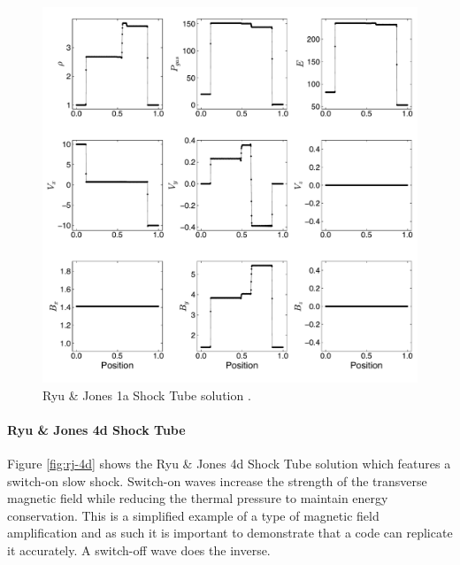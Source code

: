 \documentclass[modern]{aastex631}
\newcommand*{\img}[1]{%
    \raisebox{-.05\baselineskip}{%
        \texttt{[image: \#1]}%
    }%
}
\begin{document}
\begin{figure}[ht!]
    \includegraphics[width=\linewidth]{rj1a.pdf}
    \caption{Ryu \& Jones 1a Shock Tube solution \citep{ryu_jones_1995}.
    \href{https://zenodo.org/records/10927223}{\img{zenodo-gradient-200.png}}}
    \label{fig:rj-1a}
\end{figure}

\paragraph{Ryu \& Jones 4d Shock Tube}
Figure \ref{fig:rj-4d} shows the Ryu \& Jones 4d Shock Tube solution \citep{ryu_jones_1995} which features a switch-on slow shock. Switch-on waves increase the strength of the transverse magnetic field while reducing the thermal pressure to maintain energy conservation. This is a simplified example of a type of magnetic field amplification and as such it is important to demonstrate that a code can replicate it accurately. A switch-off wave does the inverse.
\end{document}

